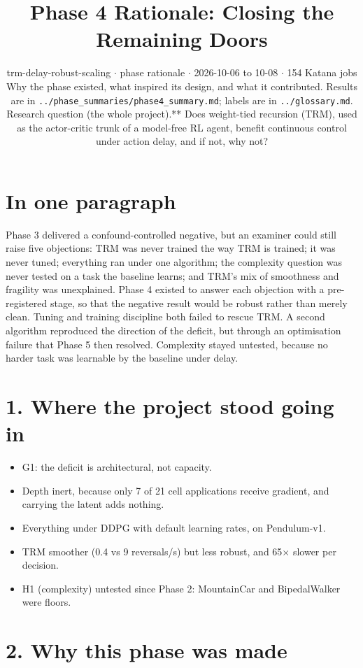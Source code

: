 \documentclass[11pt]{article}
\title{Phase 4 Rationale: Closing the Remaining Doors}
\author{}
\date{trm-delay-robust-scaling $\cdot$ phase rationale $\cdot$ 2026-10-06 to 10-08 $\cdot$ 154 Katana jobs\\[2pt]Why the phase existed, what inspired its design, and what it contributed. Results are in \texttt{.\allowbreak{}.\allowbreak{}/\allowbreak{}phase\_\allowbreak{}summaries/\allowbreak{}phase4\_\allowbreak{}summary.\allowbreak{}md}; labels are in \texttt{.\allowbreak{}.\allowbreak{}/\allowbreak{}glossary.\allowbreak{}md}.\\[2pt]Research question (the whole project).** Does weight-tied recursion (TRM), used as the actor-critic trunk of a model-free RL agent, benefit continuous control under action delay, and if not, why not?}
\begin{document}
\maketitle
\section*{In one paragraph}



Phase 3 delivered a confound-controlled negative, but an examiner could still raise five objections: TRM was never trained the way TRM is trained; it was never tuned; everything ran under one algorithm; the complexity question was never tested on a task the baseline learns; and TRM's mix of smoothness and fragility was unexplained. Phase 4 existed to answer each objection with a pre-registered stage, so that the negative result would be robust rather than merely clean. Tuning and training discipline both failed to rescue TRM. A second algorithm reproduced the direction of the deficit, but through an optimisation failure that Phase 5 then resolved. Complexity stayed untested, because no harder task was learnable by the baseline under delay.



\section*{1. Where the project stood going in}



\begin{itemize}
\item G1: the deficit is architectural, not capacity.
\item Depth inert, because only 7 of 21 cell applications receive gradient, and carrying the latent adds nothing.
\item Everything under DDPG with default learning rates, on Pendulum-v1.
\item TRM smoother (0.4 vs 9 reversals/s) but less robust, and 65$\times$ slower per decision.
\item H1 (complexity) untested since Phase 2: MountainCar and BipedalWalker were floors.
\end{itemize}



\section*{2. Why this phase was made}
\end{document}
